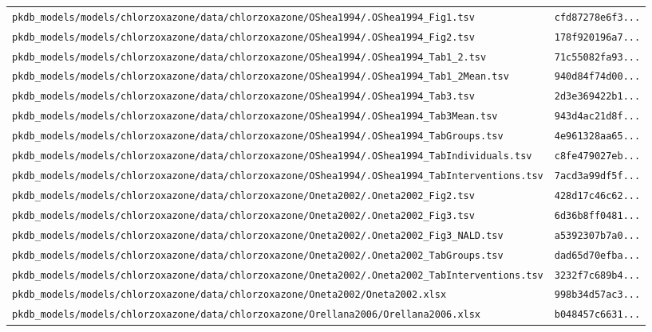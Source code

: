 \documentclass{article}
\begin{document}
\begin{longtable}{ll}
\texttt{pkdb\_models/models/chlorzoxazone/data/chlorzoxazone/OShea1994/.OShea1994\_Fig1.tsv} & \texttt{cfd87278e6f3...} \\
\texttt{pkdb\_models/models/chlorzoxazone/data/chlorzoxazone/OShea1994/.OShea1994\_Fig2.tsv} & \texttt{178f920196a7...} \\
\texttt{pkdb\_models/models/chlorzoxazone/data/chlorzoxazone/OShea1994/.OShea1994\_Tab1\_2.tsv} & \texttt{71c55082fa93...} \\
\texttt{pkdb\_models/models/chlorzoxazone/data/chlorzoxazone/OShea1994/.OShea1994\_Tab1\_2Mean.tsv} & \texttt{940d84f74d00...} \\
\texttt{pkdb\_models/models/chlorzoxazone/data/chlorzoxazone/OShea1994/.OShea1994\_Tab3.tsv} & \texttt{2d3e369422b1...} \\
\texttt{pkdb\_models/models/chlorzoxazone/data/chlorzoxazone/OShea1994/.OShea1994\_Tab3Mean.tsv} & \texttt{943d4ac21d8f...} \\
\texttt{pkdb\_models/models/chlorzoxazone/data/chlorzoxazone/OShea1994/.OShea1994\_TabGroups.tsv} & \texttt{4e961328aa65...} \\
\texttt{pkdb\_models/models/chlorzoxazone/data/chlorzoxazone/OShea1994/.OShea1994\_TabIndividuals.tsv} & \texttt{c8fe479027eb...} \\
\texttt{pkdb\_models/models/chlorzoxazone/data/chlorzoxazone/OShea1994/.OShea1994\_TabInterventions.tsv} & \texttt{7acd3a99df5f...} \\
\texttt{pkdb\_models/models/chlorzoxazone/data/chlorzoxazone/Oneta2002/.Oneta2002\_Fig2.tsv} & \texttt{428d17c46c62...} \\
\texttt{pkdb\_models/models/chlorzoxazone/data/chlorzoxazone/Oneta2002/.Oneta2002\_Fig3.tsv} & \texttt{6d36b8ff0481...} \\
\texttt{pkdb\_models/models/chlorzoxazone/data/chlorzoxazone/Oneta2002/.Oneta2002\_Fig3\_NALD.tsv} & \texttt{a5392307b7a0...} \\
\texttt{pkdb\_models/models/chlorzoxazone/data/chlorzoxazone/Oneta2002/.Oneta2002\_TabGroups.tsv} & \texttt{dad65d70efba...} \\
\texttt{pkdb\_models/models/chlorzoxazone/data/chlorzoxazone/Oneta2002/.Oneta2002\_TabInterventions.tsv} & \texttt{3232f7c689b4...} \\
\texttt{pkdb\_models/models/chlorzoxazone/data/chlorzoxazone/Oneta2002/Oneta2002.xlsx} & \texttt{998b34d57ac3...} \\
\texttt{pkdb\_models/models/chlorzoxazone/data/chlorzoxazone/Orellana2006/Orellana2006.xlsx} & \texttt{b048457c6631...} \\

\end{longtable}
\end{document}
